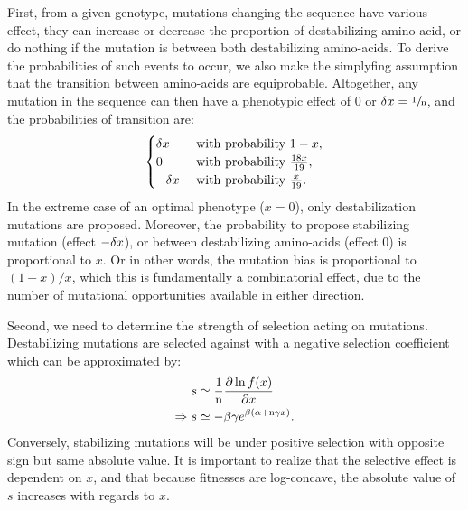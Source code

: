 \documentclass{article}
\begin{document}
	First, from a given genotype, mutations changing the sequence have various effect, they can increase or decrease the proportion of destabilizing amino-acid, or do nothing if the mutation is between both destabilizing amino-acids.
	To derive the probabilities of such events to occur, we also make the simplyfing assumption that the transition between amino-acids are equiprobable.
	Altogether, any mutation in the sequence can then have a phenotypic effect of $0$ or $\delta x=\sfrac{1}{\text{n}}$, and the probabilities of transition are:
	\begin{gather}
		\begin{cases}
		\delta x &\text{ with probability } 1-x, \\
		0 &\text{ with probability } \frac{18 x }{19}, \\
		-\delta x &\text{ with probability } \frac{x}{19}.\\
		\end{cases} \label{eq:proba}
	\end{gather}
	In the extreme case of an optimal phenotype ($x = 0$), only destabilization mutations are proposed.
	Moreover, the probability to propose stabilizing mutation (effect $-\delta x$), or between destabilizing amino-acids (effect $0$) is proportional to $x$. 
	Or in other words, the mutation bias is proportional to $(1-x)/x$, which this is fundamentally a combinatorial effect, due to the number of mutational opportunities available in either direction.
	
	Second, we need to determine the strength of selection acting on mutations.
	Destabilizing mutations are selected against with a negative selection coefficient which can be approximated by:
	\begin{align}
		s & \simeq \frac{1}{\text{n}}\frac{ \partial \ln f(x) }{\partial x} \label{eq:s} \\
		\Rightarrow s & \simeq - \beta \gamma e^{\beta (\alpha + \text{n} \gamma x)}. \label{eq:s-unfolded}
	\end{align}
	Conversely, stabilizing mutations will be under positive selection with opposite sign but same absolute value.
	It is important to realize that the selective effect is dependent on $x$, and that because fitnesses are log-concave, the absolute value of $s$ increases with regards to $x$.
	
\end{document}
